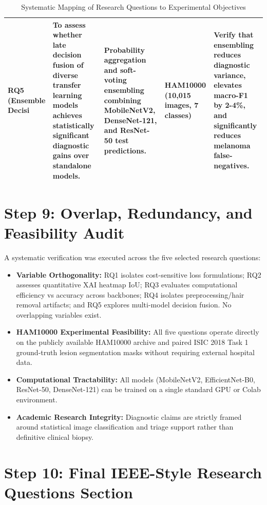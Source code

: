 \documentclass[11pt,a4paper]{article}
\begin{document}
\begin{table}[htbp]
\begin{tabularx}{\textwidth}{p{2.0cm} p{3.5cm} p{3.5cm} p{2.0cm} p{3.0cm}}
\midrule
RQ5 (Ensemble Decisi & To assess whether late decision fusion of diverse transfer learning models achieves statistically significant diagnostic gains over standalone models. & Probability aggregation and soft-voting ensembling combining MobileNetV2, DenseNet-121, and ResNet-50 test predictions. & HAM10000 (10,015 images, 7 classes) & Verify that ensembling reduces diagnostic variance, elevates macro-F1 by 2-4\%, and significantly reduces melanoma false-negatives. \\
\midrule

\bottomrule
\end{tabularx}
\caption{Systematic Mapping of Research Questions to Experimental Objectives}
\label{tab:objectives}
\end{table}

\section{Step 9: Overlap, Redundancy, and Feasibility Audit}
A systematic verification was executed across the five selected research questions:
\begin{itemize}
    \item \textbf{Variable Orthogonality:} RQ1 isolates cost-sensitive loss formulations; RQ2 assesses quantitative XAI heatmap IoU; RQ3 evaluates computational efficiency vs accuracy across backbones; RQ4 isolates preprocessing/hair removal artifacts; and RQ5 explores multi-model decision fusion. No overlapping variables exist.
    \item \textbf{HAM10000 Experimental Feasibility:} All five questions operate directly on the publicly available HAM10000 archive and paired ISIC 2018 Task 1 ground-truth lesion segmentation masks without requiring external hospital data.
    \item \textbf{Computational Tractability:} All models (MobileNetV2, EfficientNet-B0, ResNet-50, DenseNet-121) can be trained on a single standard GPU or Colab environment.
    \item \textbf{Academic Research Integrity:} Diagnostic claims are strictly framed around statistical image classification and triage support rather than definitive clinical biopsy.
\end{itemize}

\section{Step 10: Final IEEE-Style Research Questions Section}
\end{document}
